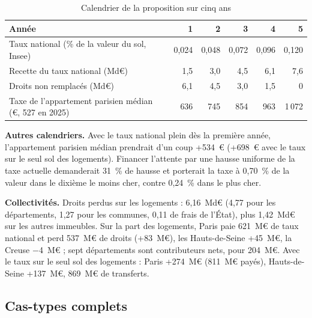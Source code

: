 \documentclass[11pt,a4paper]{article}
\begin{document}
\begin{table}[!htbp]\centering\scriptsize
\caption{Calendrier de la proposition sur cinq ans}\label{tab:fon_cal}
\begin{tabularx}{\linewidth}{@{}>{\raggedright\arraybackslash}X rrrrr@{}}
\toprule
Année & 1 & 2 & 3 & 4 & 5 \\
\midrule
Taux national (\% de la valeur du sol, Insee) & 0,024 & 0,048 & 0,072 & 0,096 & 0,120 \\
Recette du taux national (Md€) & 1,5 & 3,0 & 4,5 & 6,1 & 7,6 \\
Droits non remplacés (Md€) & 6,1 & 4,5 & 3,0 & 1,5 & 0 \\
Taxe de l'appartement parisien médian (€, 527 en 2025) & 636 & 745 & 854 & 963 & 1\,072 \\
\bottomrule
\end{tabularx}
\par\vspace{2pt}{\raggedright\scriptsize Droits divisés par deux dès l'annonce (année 0, non comptée) ; ventes et taxe
de 2025, euros de 2025. Déficit cumulé : 15,2~Md€ (12,4 avec la reprise des ventes) ; 7,6 (6,2) sur trois ans, 34,1
(27,8) sur dix. Montée retardée de trois ans : 30,3 / 37,9 / 56,8~Md€ (sur 3, 5 ou 10 ans) ; baisse des droits en deux
temps (un quart à l'annonce, un quart au démarrage), qui limite ce risque mais recrée l'attente : 18,9 / 26,5 /
45,5~Md€.\par}
\end{table}

\textbf{Autres calendriers.} Avec le taux national plein dès la première année, l'appartement parisien médian prendrait
d'un coup +534~€ (+698~€ avec le taux sur le seul sol des logements). Financer l'attente par une hausse uniforme de la
taxe actuelle demanderait 31~\% de hausse et porterait la taxe à 0,70~\% de la valeur dans le dixième le moins cher,
contre 0,24~\% dans le plus cher.

\textbf{Collectivités.} Droits perdus sur les logements : 6,16~Md€ (4,77 pour les départements, 1,27 pour les communes,
0,11 de frais de l'État), plus 1,42~Md€ sur les autres immeubles. Sur la part des logements, Paris paie 621~M€ de taux
national et perd 537~M€ de droits (+83~M€), les Hauts-de-Seine +45~M€, la Creuse $-$4~M€ ; sept départements sont
contributeurs nets, pour 204~M€. Avec le taux sur le seul sol des logements : Paris +274~M€ (811~M€ payés),
Hauts-de-Seine +137~M€, 869~M€ de transferts.

\subsection{Cas-types complets}
\end{document}
